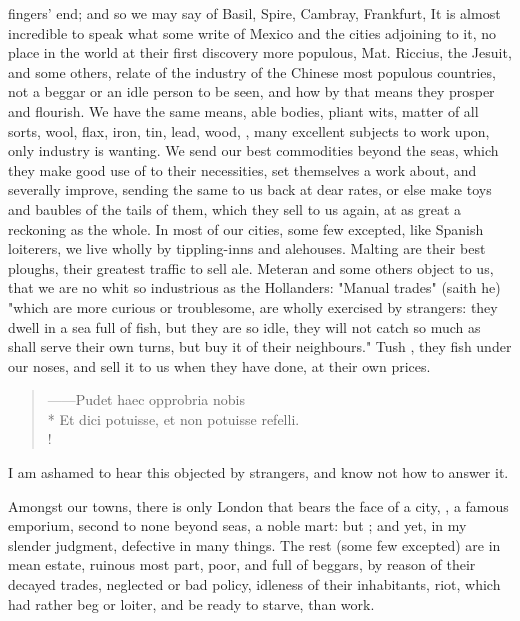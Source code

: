 fingers' end; and so we may say of Basil, Spire, Cambray, Frankfurt, \etc{} It
is almost incredible to speak what some write of Mexico and the cities
adjoining to it, no place in the world at their first discovery more populous,
Mat. Riccius, the Jesuit, and some others, relate of the
industry of the Chinese most populous countries, not a beggar or an idle person
to be seen, and how by that means they prosper and flourish. We have the same
means, able bodies, pliant wits, matter of all sorts, wool, flax, iron, tin,
lead, wood, \etc{}, many excellent subjects to work upon, only industry is
wanting. We send our best commodities beyond the seas, which they make good use
of to their necessities, set themselves a work about, and severally improve,
sending the same to us back at dear rates, or else make toys and baubles of the
tails of them, which they sell to us again, at as great a reckoning as the
whole. In most of our cities, some few excepted, like
Spanish loiterers, we live wholly by tippling-inns and
alehouses. Malting are their best ploughs, their greatest traffic to sell ale.
Meteran and some others object to us, that we are no whit
so industrious as the Hollanders: "Manual trades" (saith he) "which are more
curious or troublesome, are wholly exercised by strangers: they dwell in a sea
full of fish, but they are so idle, they will not catch so much as shall serve
their own turns, but buy it of their neighbours." Tush
, they fish under our noses, and sell it
to us when they have done, at their own prices.

\begin{latin}
\begin{verse}%
------Pudet haec opprobria nobis\\*
Et dici potuisse, et non potuisse refelli.\\!
\end{verse}%
\end{latin}

I am ashamed to hear this objected by strangers, and know not how to answer it.

Amongst our towns, there is only London that bears the face
of a city, , a famous emporium,
second to none beyond seas, a noble mart: but ; and yet, in my slender judgment, defective in many things. The rest
(some few excepted) are in mean estate, ruinous most part,
poor, and full of beggars, by reason of their decayed trades, neglected or bad
policy, idleness of their inhabitants, riot, which had rather beg or loiter,
and be ready to starve, than work.

